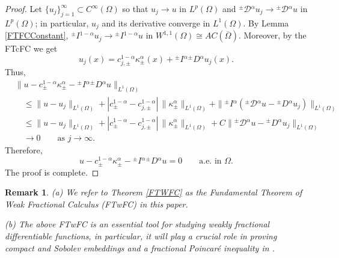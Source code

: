 \documentclass[leqno,final]{siamltex}
\numberwithin{equation}{section}
\newtheorem{remark}{Remark}[section]
\newcommand{\Ome}{{\Omega}}
\renewcommand{\(}{\bigl(}
\renewcommand{\)}{\bigr)}
\begin{document}
   \begin{proof}
      Let $\{u_j \}_{j=1}^{\infty} \subset C^{\infty}(\Omega)$ so that $u_j \rightarrow u$ 
      in $L^{p}(\Omega)$ and ${^{\pm}}{\mathcal{D}}{^{\alpha}}u_j \rightarrow {^{\pm}}{\mathcal{D}}{^{\alpha}}u$ in $L^{p}(\Omega)$; in particular, 
      $u_j$ and its derivative converge in $L^{1}(\Omega)$. By Lemma \ref{FTFCConstant}, ${^{\pm}}{I}{^{1-\alpha}}u_j \rightarrow {^{\pm}}{I}{^{1-\alpha}} u$ in $W^{1,1}(\Ome)\cong AC(\overline{\Omega})$.
      Moreover, by the FTcFC we get
      \[
      u_j (x) = c^{1-\alpha}_{j,\pm} \kappa^{\alpha}_{\pm}(x)  + {^{\pm}}{I}{^{\alpha}}{^{\pm}}{D}{^{\alpha}} u_j (x).
      \]
Thus,
      \begin{align*}
     & \|u-c^{1-\alpha}_{\pm} \kappa^{\alpha}_{\pm} - {^{\pm}}{I}{^{\alpha}}  {^{\pm}}{D}{^{\alpha}} u\|_{L^1(\Omega)} \\
         &\quad\leq  \|u - u_j\|_{L^{1}(\Omega)} + |c^{1-\alpha}_{\pm} - c^{1-\alpha}_{j,\pm}| \,\|\kappa^{\alpha}_{\pm}\|_{L^{1}(\Omega)} + \|{^{\pm}}{I}{^{\alpha}} ({^{\pm}}{\mathcal{D}}{^{\alpha}} u - {^{\pm}}{D}{^{\alpha}} u_j ) \|_{L^{1}(\Omega)}\\
         &\quad\leq  \|u - u_j\|_{L^{1}(\Omega)} + |c^{1-\alpha}_{\pm} - c^{1-\alpha}_{j,\pm}| \,\|\kappa^{\alpha}_{\pm}\|_{L^{1}(\Omega)} + C\|{^{\pm}}{\mathcal{D}}{^{\alpha}} u - {^{\pm}}{D}{^{\alpha}}u_j\|_{L^{1}(\Omega)} \\
         &\quad \to 0 \qquad\mbox{as } j\to \infty.
      \end{align*}
     Therefore, 
     \[
     u -c^{1-\alpha}_{\pm} \kappa^{\alpha}_{\pm} - {^{\pm}}{I}{^{\alpha}}  {^{\pm}}{D}{^{\alpha}} u =0 \qquad \mbox{a.e. in }  \Omega.
     \]
  The proof is complete. 
   \end{proof}

\begin{remark}
	(a) We refer to Theorem \ref{FTWFC} as the Fundamental Theorem of Weak Fractional 
	Calculus (FTwFC) in this paper.  
	
	(b) The above FTwFC is an essential tool for studying weakly fractional differentiable functions, 
	in particular, it will play a crucial role in proving compact and Sobolev embeddings and a fractional Poincar\'e inequality in  \cite{Feng_Sutton1a}.
\end{remark}
   
\end{document}
